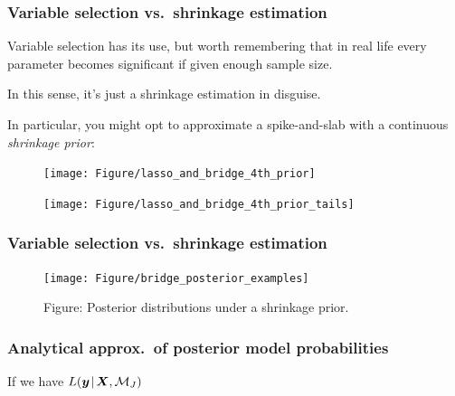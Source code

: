 \documentclass[18pt]{beamer}
\newcommand{\given}{\mskip.7\thinmuskip | \mskip.7\thinmuskip}
\newcommand{\likelihood}{L}
\newcommand{\by}{\bm{y}}
\newcommand{\bX}{\bm{X}}
\newcommand{\model}{\mathcal{M}}
\newcommand{\nonzeroCoefSet}{J}
\begin{document}
\begin{frame}
\frametitle{Variable selection vs.\ shrinkage estimation}

Variable selection has its use, but worth remembering that in real life every parameter becomes significant if given enough sample size.

In this sense, it's just a shrinkage estimation in disguise. 

In particular, you might opt to approximate a spike-and-slab with a continuous \textit{shrinkage prior}:

\vspace{-.3\baselineskip}
	\begin{figure}
		\begin{minipage}{.48\linewidth}
		\texttt{[image: Figure/lasso\_and\_bridge\_4th\_prior]}
		\end{minipage}
		\begin{minipage}{.48\linewidth}
			\texttt{[image: Figure/lasso\_and\_bridge\_4th\_prior\_tails]}
		\end{minipage}
	\end{figure} \vspace{-.3\baselineskip}

\end{frame}


\begin{frame}
\frametitle{Variable selection vs.\ shrinkage estimation}
\begin{figure}
\texttt{[image: Figure/bridge\_posterior\_examples]}
\caption*{\textcolor{themecolor}{Figure:}
	Posterior distributions under a shrinkage prior.
}
\end{figure}
\end{frame}


\begin{frame}
\frametitle{Analytical approx.\ of posterior model probabilities}
If we have
$\likelihood(\by \given \bX,  \model_\nonzeroCoefSet)$
\end{frame}

\end{document}
